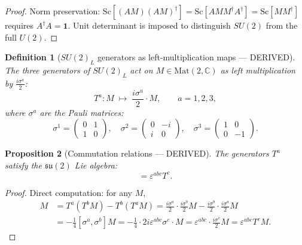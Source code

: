 \documentclass[12pt]{article}
\newtheorem{definition}{Definition}[section]
\newtheorem{proposition}[definition]{Proposition}
\newcommand{\C}{\mathbb{C}}
\newcommand{\su}{\mathfrak{su}}
\begin{document}
\begin{proof}
Norm preservation: $\mathrm{Sc}[(AM)(AM)^\dagger] = \mathrm{Sc}[A M M^\dagger A^\dagger] =
\mathrm{Sc}[M M^\dagger]$ requires $A^\dagger A = \mathbf{1}$.
Unit determinant is imposed to distinguish $SU(2)$ from the full $U(2)$.
\end{proof}

\begin{definition}[$SU(2)_L$ generators as left-multiplication maps --- DERIVED]
\label{def:su2l_generators}
The three generators of $SU(2)_L$ act on $M \in \mathrm{Mat}(2,\C)$ as
left multiplication by $\frac{i\sigma^a}{2}$:
\begin{equation}
  T^a : M \;\mapsto\; \frac{i\sigma^a}{2} \cdot M, \qquad a = 1, 2, 3,
\end{equation}
where $\sigma^a$ are the Pauli matrices:
\begin{equation}
  \sigma^1 = \begin{pmatrix} 0 & 1 \\ 1 & 0 \end{pmatrix}, \quad
  \sigma^2 = \begin{pmatrix} 0 & -i \\ i & 0 \end{pmatrix}, \quad
  \sigma^3 = \begin{pmatrix} 1 & 0 \\ 0 & -1 \end{pmatrix}.
\end{equation}
\end{definition}

\begin{proposition}[Commutation relations --- DERIVED]
\label{prop:su2l_commutators}
The generators $T^a$ satisfy the $\su(2)$ Lie algebra:
\begin{equation}
  [T^a, T^b] = \varepsilon^{abc} T^c. \tag{DERIVED}
\end{equation}
\end{proposition}

\begin{proof}
Direct computation: for any $M$,
\begin{align*}
  [T^a, T^b] M &= T^a(T^b M) - T^b(T^a M)
    = \frac{i\sigma^a}{2} \cdot \frac{i\sigma^b}{2} M - \frac{i\sigma^b}{2} \cdot \frac{i\sigma^a}{2} M \\
    &= -\tfrac{1}{4}[\sigma^a, \sigma^b] M
    = -\tfrac{1}{4} \cdot 2i\varepsilon^{abc}\sigma^c \cdot M
    = \varepsilon^{abc} \cdot \frac{i\sigma^c}{2} M = \varepsilon^{abc} T^c M.
\end{align*}
\end{proof}
\end{document}
